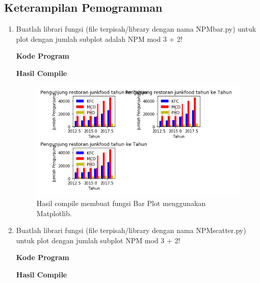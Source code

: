 	\subsection{Keterampilan Pemogramman}
	\begin{enumerate}
		\item Buatlah librari fungsi (file terpisah/library dengan nama NPMbar.py) untuk plot dengan jumlah subplot adalah NPM mod 3 + 2!

			\hfill \break
			\textbf{Kode Program}

			

			\hfill \break
			\textbf{Hasil Compile}

			\begin{figure}[H]
				\includegraphics[width=12cm]{figures/chapter6/1174057/praktek1.png}
				\centering
				\caption{Hasil compile membuat fungsi Bar Plot menggunakan Matplotlib.}
			\end{figure}
			
		\item Buatlah librari fungsi (file terpisah/library dengan nama NPMscatter.py) untuk plot dengan jumlah subplot NPM mod 3 + 2!
					
			\hfill \break
			\textbf{Kode Program}

			

			\hfill \break
			\textbf{Hasil Compile}


\end{enumerate}
